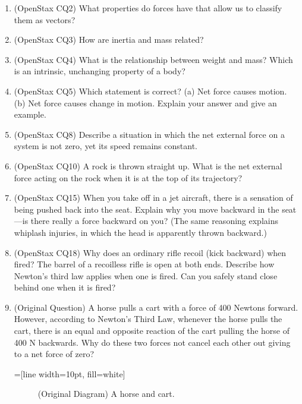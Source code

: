 \documentclass[10pt,twocolumn]{exam}
\begin{document}
\begin{questions}
  \begin{enumerate}[label=CQ\arabic*.]
    \item (OpenStax CQ2) What properties do forces have that allow us to classify them as vectors?
    \item (OpenStax CQ3) How are inertia and mass related?
    \item (OpenStax CQ4) What is the relationship between weight and mass? Which is an intrinsic, unchanging property of a body?
    \item (OpenStax CQ5) Which statement is correct? (a) Net force causes motion. (b) Net force causes change in motion. Explain your answer and give an example.
    \item (OpenStax CQ8) Describe a situation in which the net external force on a system is not zero, yet its speed remains constant.
    \item (OpenStax CQ10) A rock is thrown straight up. What is the net external force acting on the rock when it is at the top of its trajectory?
    \item (OpenStax CQ15) When you take off in a jet aircraft, there is a sensation of being pushed back into the seat. Explain why you move backward in the seat—is there really a force backward on you? (The same reasoning explains whiplash injuries, in which the head is apparently thrown backward.)
    \item (OpenStax CQ18) Why does an ordinary rifle recoil (kick backward) when fired? The barrel of a recoilless rifle is open at both ends. Describe how Newton's third law applies when one is fired. Can you safely stand close behind one when it is fired?
    \item (Original Question) A horse pulls a cart with a force of 400 Newtons forward.  However, according to Newton's Third Law, whenever the horse pulls the cart, there is an equal and opposite reaction of the cart pulling the horse of 400 N backwards.  Why do these two forces not cancel each other out giving to a net force of zero?

    =[line width=10pt, fill=white]

    \begin{figure}[ht]
      \centering
      \caption{(Original Diagram) A horse and cart.}
      \label{horse-cart}
    \end{figure}


\end{enumerate}
\end{questions}
\end{document}
